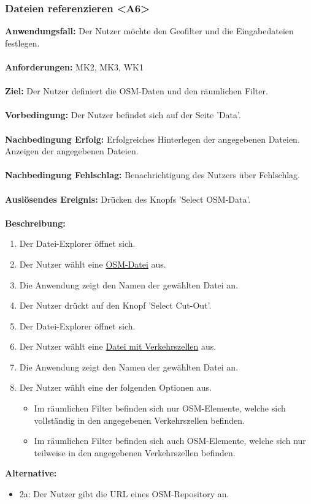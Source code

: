 \documentclass[parskip=full]{scrartcl} %
\begin{document}
\subsubsection*{Dateien referenzieren <A6>}
\textbf{Anwendungsfall:} Der Nutzer möchte den Geofilter und die Eingabedateien festlegen.\\\\
\textbf{Anforderungen:} MK2, MK3, WK1 \\\\
\textbf{Ziel:} Der Nutzer definiert die OSM-Daten und den räumlichen Filter.\\\\
\textbf{Vorbedingung:} Der Nutzer befindet sich auf der Seite 'Data'. \\\\
\textbf{Nachbedingung Erfolg:} Erfolgreiches Hinterlegen der angegebenen Dateien. Anzeigen der angegebenen Dateien.\\\\
\textbf{Nachbedingung Fehlschlag:} Benachrichtigung des Nutzers über Fehlschlag. \\\\
\textbf{Auslösendes Ereignis:} Drücken des Knopfs 'Select OSM-Data'.\\\\
\textbf{Beschreibung:}
\begin{enumerate}
    \item Der Datei-Explorer öffnet sich.
    \item Der Nutzer wählt eine \hyperlink{dataformat}{OSM-Datei} aus.
    \item Die Anwendung zeigt den Namen der gewählten Datei an.
    \item Der Nutzer drückt auf den Knopf 'Select Cut-Out'.
    \item Der Datei-Explorer öffnet sich.
    \item Der Nutzer wählt eine \hyperlink{dataformat}{Datei mit Verkehrszellen} aus.
    \item Die Anwendung zeigt den Namen der gewählten Datei an.
    \item Der Nutzer wählt eine der folgenden Optionen aus.
    \begin{itemize}
        \item Im räumlichen Filter befinden sich nur OSM-Elemente, welche sich vollständig in den angegebenen Verkehrszellen befinden.
        \item Im räumlichen Filter befinden sich auch OSM-Elemente, welche sich nur teilweise in den angegebenen Verkehrszellen befinden.
    \end{itemize}
\end{enumerate}
\textbf{Alternative:}
\begin{itemize}
    \item 2a: Der Nutzer gibt die URL eines OSM-Repository an.
\end{itemize}
\newpage
\end{document}
